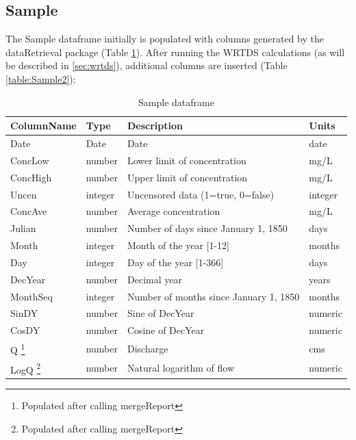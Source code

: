 \documentclass[a4paper,11pt]{article}\usepackage{graphicx, color}
\begin{document}
\FloatBarrier


\subsection{Sample}
\label{sec:dataframesSample}
The Sample dataframe initially is populated with columns generated by the dataRetrieval package (Table \ref{table:Sample1}). After running the WRTDS calculations (as will be described in \ref{sec:wrtds}), additional columns are inserted (Table \ref{table:Sample2}):

\begin{table}[!ht]
\begin{minipage}{\linewidth}
\centering
\caption{Sample dataframe} 
\label{table:Sample1}
\begin{tabular}{llll}
  \hline
ColumnName & Type & Description & Units \\ 
  \hline
Date & Date & Date & date \\ 
  ConcLow & number & Lower limit of concentration & mg/L \\ 
  ConcHigh & number & Upper limit of concentration & mg/L \\ 
  Uncen & integer & Uncensored data (1=true, 0=false) & integer \\ 
  ConcAve & number & Average concentration & mg/L \\ 
  Julian & number & Number of days since January 1, 1850 & days \\ 
  Month & integer & Month of the year [1-12] & months \\ 
  Day & integer & Day of the year [1-366] & days \\ 
  DecYear & number & Decimal year & years \\ 
  MonthSeq & integer & Number of months since January 1, 1850 & months \\ 
  SinDY & number & Sine of DecYear & numeric \\ 
  CosDY & number & Cosine of DecYear & numeric \\ 
  Q \footnote{Populated after calling mergeReport} & number & Discharge & cms \\ 
  LogQ \footnote{Populated after calling mergeReport} & number & Natural logarithm of flow & numeric \\ 
   \hline
\end{tabular}
\end{minipage}
\end{table}
\end{document}
